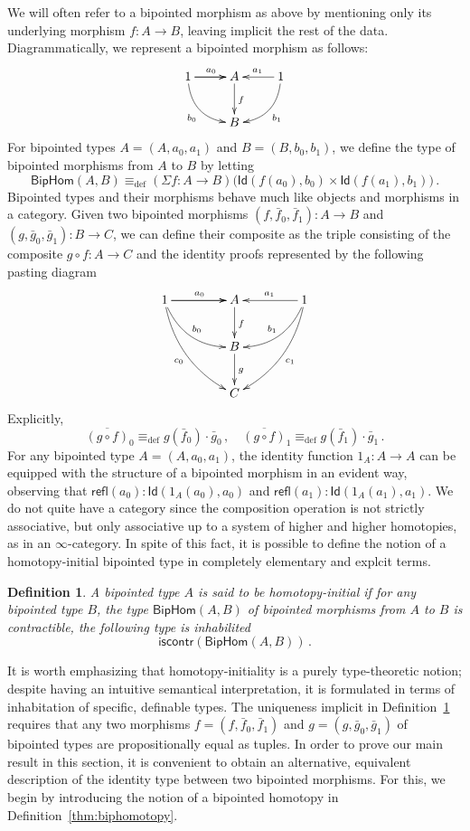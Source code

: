 \documentclass[reqno,10pt,a4paper,oneside]{amsart}
\numberwithin{equation}{section}
\theoremstyle{mythm}
\theoremstyle{mydef}
\newtheorem{definition}[theorem]{Definition}
\theoremstyle{myrmk}
\newcommand{\ie}{\text{i.e.\ }}
\newcommand{\deq}{\equiv}
\newcommand{\defeq}{\deq_{\mathrm{def}}}
\newcommand{\co}{\colon}
\newcommand{\iscontr}{\mathsf{iscontr}}
\newcommand{\Id}{\mathsf{Id}}
\newcommand{\refl}{\mathsf{refl}}
\begin{document}
We will often refer to a bipointed morphism as above by mentioning only its underlying morphism $f \co A \to B$, leaving implicit
the rest of the data. Diagrammatically, we represent a bipointed morphism as follows:
\[
\xymatrix{
1 \ar[r]   \ar[r]^{a_0} \ar@/_1pc/[dr]_{b_0}  & A  \ar[d]^{f} & 1  \ar[l]_{a_1} \ar@/^1pc/[dl]^{b_1} \\
  & B  &  }
 \]
For bipointed types $A = (A, a_0, a_1)$ and $B = (B, b_0, b_1)$, we define the type of bipointed morphisms from $A$ to $B$ by letting
\[
\mathsf{BipHom}(A,B) \defeq (\Sigma f \co A \to B) \big( \Id( f(a_0), b_0) \times \Id( f(a_1), b_1) \big) \, .
\]
Bipointed types and their morphisms behave much like objects and morphisms in a category.
Given two bipointed morphisms  $(f, \bar{f}_0, \bar{f}_1) \co A \to B$ and $(g, \bar{g}_0, \bar{g}_1) \co B \to C$, we can define their composite 
 as the triple consisting of the composite $g \circ f \co A \to C$ and the identity proofs represented
by the following pasting diagram
\[
\xymatrix@C=1.5cm{
1 \ar[r]   \ar[r]^{a_0}   \ar@/_1pc/[dr]^{b_0} \ar@/_1pc/[ddr]_{c_0}  & A  \ar[d]^{f} & 1 \ar[l]_{a_1}  \ar@/^1pc/[dl]_{b_1}  \ar@/^1pc/[ddl]^{c_1} \\
  & B \ar[d]^g &   \\
  & C &   }
  \]
Explicitly,
\[
\overline{(g \circ f)}_0 \defeq g(\bar{f}_0) \cdot  \bar{g}_0 \, ,   \quad 
\overline{(g \circ f) }_1 \defeq  g(\bar{f}_1) \cdot   \bar{g}_1 \, .
\]
For any bipointed type $A = (A, a_0, a_1)$, the identity function $1_A \co A \to A$ can be equipped with the structure of a 
bipointed morphism in an evident way, observing that $\refl(a_0) \co \Id( 1_A(a_0), a_0)$ and $\refl(a_1) \co \Id( 1_A(a_1), a_1)$. 
We do not quite have a category since the composition operation is not strictly associative, but only associative up to a system of higher and higher 
homotopies, as in an $\infty$-category. In spite of this fact, it is possible to define the notion of a homotopy-initial bipointed
type in completely elementary and explcit terms.



\begin{definition}\label{def:BoolInit}
A bipointed type $A$ is said to be \emph{homotopy-initial}  if for any bipointed type $B$, the type $\mathsf{BipHom}(A,B)$ of bipointed morphisms from $A$ to $B$
is contractible, \ie the following type is inhabilited
\[
 \iscontr(\mathsf{BipHom}(A, B) ) \, .
\]  
\end{definition}


It is worth emphasizing that homotopy-initiality is a purely type-theoretic notion; despite having an intuitive semantical interpretation, it is formulated in terms of inhabitation of specific, definable types. The uniqueness implicit in Definition~\ref{def:BoolInit} requires that
any two morphisms $f = (f,\bar{f}_0,\bar{f}_1)$ and $g = (g,\bar{g}_0,\bar{g}_1)$ of bipointed types are propositionally equal as tuples.
 In order
to prove our main result in this section, it is convenient to obtain an alternative, equivalent description of the identity
type between two bipointed morphisms. For this, we begin by introducing the notion of a bipointed homotopy in Definition~\ref{thm:biphomotopy}.
\end{document}

